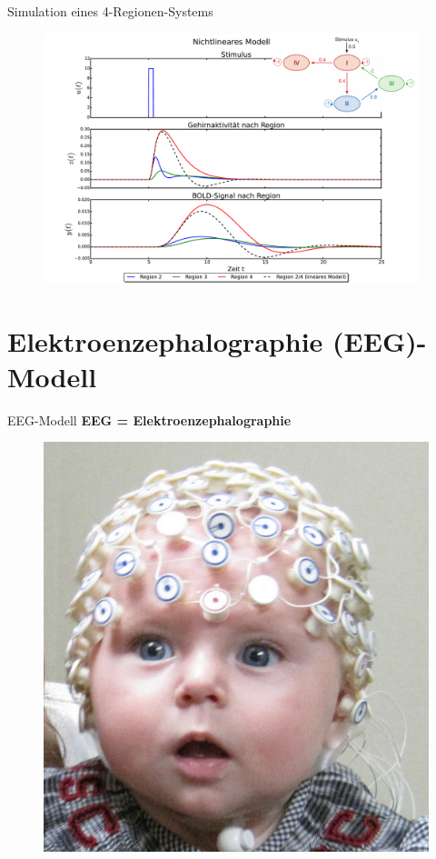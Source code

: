 \documentclass{beamer}
\begin{document}
\begin{frame}{Simulation eines 4-Regionen-Systems}
	\begin{figure}
		\vspace*{-0.33cm}
		\centering
		\includegraphics[width=0.975\textwidth]{res/hemodynamicExample2.pdf}
	\end{figure}
\end{frame}

\section{Elektroenzephalographie (EEG)-Modell}
\begin{frame}{EEG-Modell}
\textbf{EEG = Elektroenzephalographie}
\begin{figure}
\centering
\includegraphics[scale=0.3]{res/EEGbaby.png}
\end{figure}
\end{frame}
\end{document}
